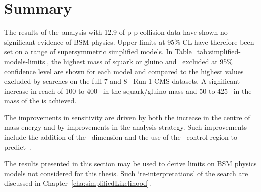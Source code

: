\section{Summary}

The results of the~\alphat analysis with 12.9 \ifb of p-p collision data have shown no significant
evidence of BSM physics. Upper limits at 95\% CL have therefore been set on a range 
of supersymmetric simplified models. In Table~\ref{tab:simplified-models-limits}, the highest mass 
of squark or gluino and \chiz~excluded at 95\% confidence level are shown for each model and compared to the highest
values excluded by searches on the full 7 and 8 \TeV~Run 1 CMS datasets. 
A significant increase in reach of 100 to 400 \GeV~in the
squark/gluino mass and 50 to 425 \GeV~in the mass of the \chiz is achieved. 

The improvements in sensitivity are driven by both the increase in the 
centre of mass energy and by improvements in the analysis strategy. Such improvements
include the addition of the \mht~dimension and the use of the \mj~control region
to predict~\zInv.


The results presented in this section may be used to derive limits on BSM physics models 
not considered for this thesis. Such `re-interpretations' of the \alphat search 
are discussed in Chapter~\ref{cha:simplifiedLikelihood}.

